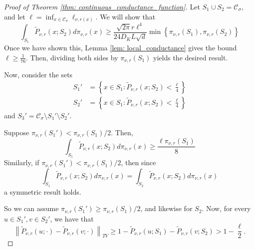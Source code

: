 \documentclass{article}
\newcommand{\norm}[1]{\left\lVert#1\right\rVert}
\newcommand{\set}[1]{\left\{#1\right\}}
\newcommand{\Cset}{\mathcal{C}}
\newcommand{\Csig}{\Cset_{\sigma}}
\newcommand{\1}{\mathbf{1}}
\theoremstyle{alden}
\theoremstyle{aldenthm}
\theoremstyle{remark}
\begin{document}
\begin{proof}[Proof of Theorem \ref{thm: continuous_conductance_function}]
	Let $S_1 \cup S_2 = \Csig$, and let $\ell = \inf_{x \in \Csig}\ell_{\nu,r(x)}$. We will show that 
	\begin{equation*}
	\int_{S_1} \widetilde{P}_{\nu,r}(x; S_2) d \pi_{\nu,r}(x) \geq \frac{\sqrt{2 \pi} r \ell^4}{24 D_K L \sqrt{d}} \min\set{\pi_{\nu,r}(S_1), \pi_{\nu,r}(S_2)}
	\end{equation*}
	Once we have shown this, Lemma \ref{lem: local_conductance} gives the bound $\ell \geq \frac{1}{76}$. Then, dividing both sides by $\pi_{\nu,r}(S_1)$ yields the desired result.
	
	Now, consider the sets
	\begin{align*}
	S_1' & = \set{x \in S_1: \widetilde{P}_{\nu,r}(x; S_2) < \frac{\ell}{4}} \\
	S_2' & = \set{x \in S_1: \widetilde{P}_{\nu,r}(x; S_2) < \frac{\ell}{4}}
	\end{align*}
	and $S_3' = \Csig \setminus S_1' \setminus S_2'$. 
	
	Suppose $\pi_{\nu,r}(S_1') < \pi_{\nu,r}(S_1)/2$. Then,
	\begin{equation*}
	\int_{S_1} \widetilde{P}_{\nu,r}(x; S_2) d \pi_{\nu,r}(x) \geq \frac{\ell  \pi_{\nu,r}(S_1)}{8}
	\end{equation*}
	Similarly, if $\pi_{\nu,r}(S_1') < \pi_{\nu,r}(S_1)/2$, then since
	\begin{equation*}
	\int_{S_1} \widetilde{P}_{\nu,r}(x; S_2) d \pi_{\nu,r}(x) = \int_{S_2} \widetilde{P}_{\nu,r}(x; S_2) d \pi_{\nu,r}(x)
	\end{equation*}
	a symmetric result holds.
	
	So we can assume $\pi_{\nu,r}(S_1') \geq \pi_{\nu,r}(S_1)/2$, and likewise for $S_2$. Now, for every $u \in S_1', v \in S_2'$, we have that
	\begin{equation*}
	\norm{\widetilde{P}_{\nu,r}(u;\cdot) - \widetilde{P}_{\nu,r}(v;\cdot)}_{TV} \geq 1 - \widetilde{P}_{\nu,r}(u;S_1) - \widetilde{P}_{\nu,r}(v;S_2) > 1 - \frac{\ell}{2}.
	\end{equation*}
	

\end{proof}
\end{document}
